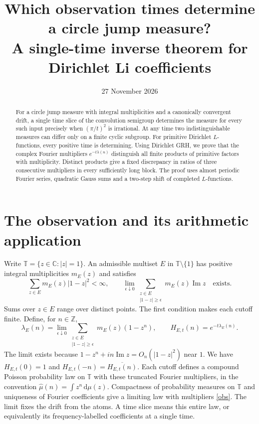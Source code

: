 \documentclass[11pt]{article}
\title{Which observation times determine a circle jump measure?\\
\large A single-time inverse theorem for Dirichlet Li coefficients}
\author{}
\date{27 November 2026}
\newcommand{\T}{\mathbb T}
\newcommand{\Z}{\mathbb Z}
\newcommand{\C}{\mathbb C}
\newcommand{\dd}{\mathrm d}
\begin{document}
\maketitle
\begin{abstract}
For a circle jump measure with integral multiplicities and a canonically
convergent drift, a single time slice of the convolution semigroup
determines the measure for every such input precisely when $(\pi/t)^2$ is
irrational. At any time two indistinguishable measures can differ only
on a finite cyclic subgroup. For primitive Dirichlet $L$-functions, every
positive time is determining. Using Dirichlet GRH, we prove that the
complex Fourier multipliers $e^{-t\lambda(n)}$ distinguish all finite
products of primitive factors with multiplicity. Distinct products give a
fixed discrepancy in ratios of three consecutive multipliers in every
sufficiently long block. The proof uses almost periodic Fourier series,
quadratic Gauss sums and a two-step shift of completed $L$-functions.
\end{abstract}

\section{The observation and its arithmetic application}

Write $\T=\{z\in\C:|z|=1\}$. An admissible multiset $E$ in
$\T\setminus\{1\}$ has positive integral multiplicities $m_E(z)$ and satisfies
\begin{equation}
 \sum_{z\in E}m_E(z)|1-z|^2<\infty,\qquad
 \lim_{\epsilon\downarrow0}
 \sum_{\substack{z\in E\\|1-z|\ge\epsilon}}m_E(z)\operatorname{Im}z
 \quad\text{exists}. \label{ad}
\end{equation}
Sums over $z\in E$ range over distinct points. The first condition makes
each cutoff finite. Define, for $n\in\Z$,
\begin{equation}
 \lambda_E(n)=\lim_{\epsilon\downarrow0}
 \sum_{\substack{z\in E\\|1-z|\ge\epsilon}}m_E(z)(1-z^n),
 \qquad H_{E,t}(n)=e^{-t\lambda_E(n)}. \label{obs}
\end{equation}
The limit exists because $1-z^n+in\operatorname{Im} z=O_n(|1-z|^2)$
near $1$. We have $H_{E,t}(0)=1$ and $H_{E,t}(-n)=\overline{H_{E,t}(n)}$.
Each cutoff defines a compound Poisson probability law on $\T$ with these
truncated Fourier multipliers, in the convention
$\widehat\mu(n)=\int z^n\,\dd\mu(z)$. Compactness of probability measures
on $\T$ and uniqueness of Fourier coefficients give a limiting law with
multipliers \eqref{obs}. The limit fixes the drift from the atoms. A time
slice means this entire law, or equivalently its frequency-labelled
coefficients at a single time.
\end{document}
